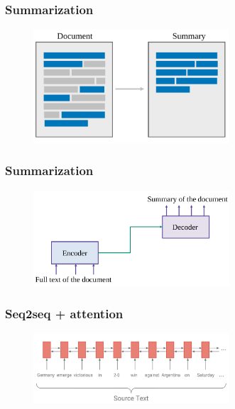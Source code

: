 \documentclass{tum-presentation}
\begin{document}
\begin{frame}
	\frametitle{Summarization}
	\begin{figure}
		\centering
		\includegraphics[width=0.65\textwidth,keepaspectratio=true]{tum-resources/images/summ_1.png}
		\label{fig:summ_1}
	\end{figure}
\end{frame}

\begin{frame}
	\frametitle{Summarization}
	\begin{figure}
		\centering
		\includegraphics[width=0.65\textwidth,keepaspectratio=true]{tum-resources/images/summ_2.png}
		\label{fig:summ_2}
	\end{figure}
\end{frame}

\begin{frame}
	\frametitle{Seq2seq + attention}
	\begin{figure}
		\centering
		\includegraphics[width=0.65\textwidth,keepaspectratio=true]{tum-resources/images/p_summ_1.png}
		\label{fig:p_summ_1}
	\end{figure}
\end{frame}
\end{document}
